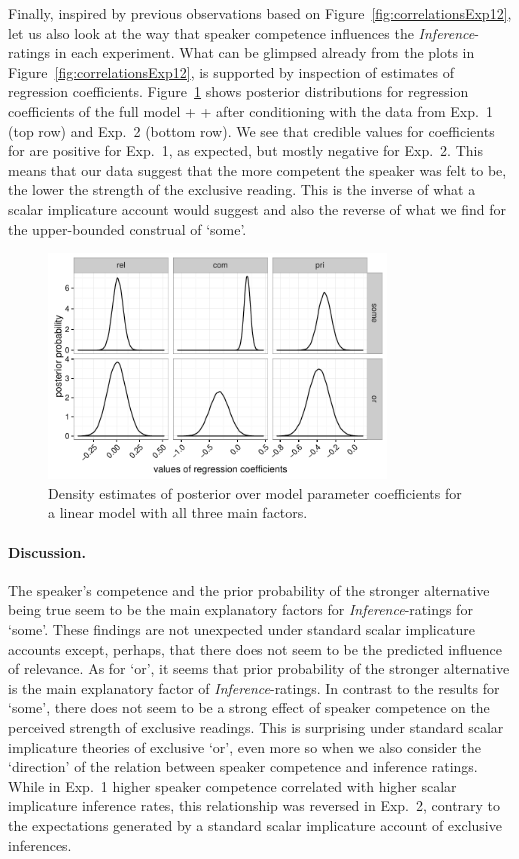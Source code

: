 \documentclass[12pt]{article}
\begin{document}
Finally, inspired by previous observations based on Figure~\ref{fig:correlationsExp12}, let us
also look at the way that speaker competence influences the \emph{Inference}-ratings in each
experiment. What can be glimpsed already from the plots in Figure~\ref{fig:correlationsExp12},
is supported by inspection of estimates of regression
coefficients. Figure~\ref{fig:densityMCMC} shows posterior distributions for regression
coefficients of the full model \rel + \com + \pri after conditioning with the data from Exp.~1
(top row) and Exp.~2 (bottom row). We see that credible values for coefficients for \com are
positive for Exp.~1, as expected, but mostly negative for Exp.~2. This means that our data
suggest that the more competent the speaker was felt to be, the lower the strength of the
exclusive reading. This is the inverse of what a scalar implicature account would suggest and
also the reverse of what we find for the upper-bounded construal of `some'. 

\begin{figure}
  \centering
  \includegraphics[width=0.8\textwidth]{pics_02/densityMCMCExp12.pdf}
  \caption{Density estimates of posterior over model parameter coefficients for a linear model
    with all three main factors.}
  \label{fig:densityMCMC}
\end{figure}

\paragraph{Discussion.} The speaker's competence and the prior probability of the stronger alternative being true seem to be the main explanatory factors for \emph{Inference}-ratings for `some'. These findings are not unexpected
under standard scalar implicature accounts except, perhaps, that there does not seem to be the
predicted influence of relevance. As for `or', it seems that prior probability of the
stronger alternative is the main explanatory factor of \emph{Inference}-ratings. In contrast
to the results for `some', there does not seem to be a strong effect of speaker competence on
the perceived strength of exclusive readings. This is surprising under standard scalar
implicature theories of exclusive `or', even more so when we also consider the
`direction' of the relation between speaker competence and inference ratings. While in Exp.~1
higher speaker competence correlated with higher scalar implicature inference rates, this
relationship was reversed in Exp.~2, contrary to the expectations generated by a standard scalar
implicature account of exclusive inferences. 
\end{document}
